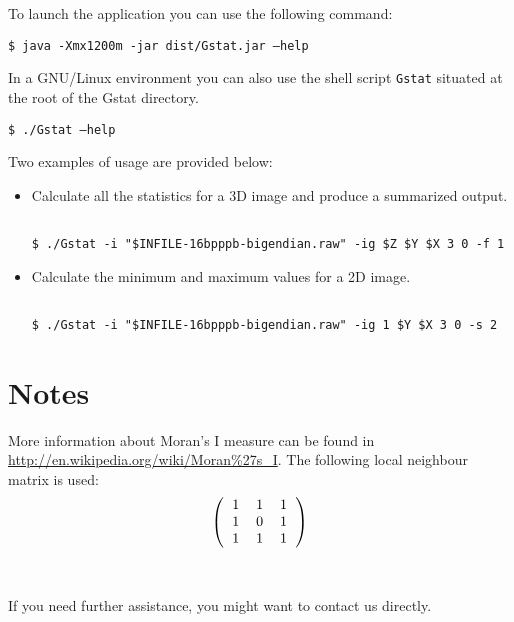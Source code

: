 \documentclass[a4paper,10pt]{article}
\newcommand{\me}{Gstat\relax }
\begin{document}
To launch the application you can use the following command: 

\begin{framed}
\texttt{\$ java -Xmx1200m -jar dist/\me{}.jar --help}
\end{framed}

In a GNU/Linux environment you can also use the shell script \texttt{\me{}} situated at the root of the \me{} directory. 

\begin{framed}
\texttt{\$ ./\me{} --help}
\end{framed}

Two examples of usage are provided below:

\begin{itemize}
\item Calculate all the statistics for a 3D image and produce a summarized output.
\begin{framed}%
\vspace{-1em}%
\begin{verbatim}

$ ./Gstat -i "$INFILE-16bpppb-bigendian.raw" -ig $Z $Y $X 3 0 -f 1 
\end{verbatim}%
\vspace{-1em}%
\end{framed}

\item Calculate the minimum and maximum values for a 2D image.
\begin{framed}%
\vspace{-1em}%
\begin{verbatim}

$ ./Gstat -i "$INFILE-16bpppb-bigendian.raw" -ig 1 $Y $X 3 0 -s 2
\end{verbatim}%
\vspace{-1em}%
\end{framed}
\end{itemize}

\section{Notes}

More information about Moran's I measure can be found in
\url{http://en.wikipedia.org/wiki/Moran\%27s_I}. The following
local neighbour matrix is used:
$$
\left(
\begin{tabular}{c c c}
1 & 1 & 1 \\
1 & 0 & 1 \\
1 & 1 & 1 \\
\end{tabular}
\right)
$$
\ \\
\ \\
\noindent
If you need further assistance, you might want to contact us directly.
\end{document}
